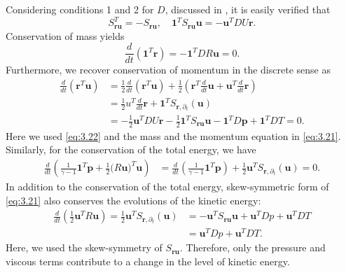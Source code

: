 Considering conditions 1 and 2 for $D$, discussed in , it is easily verified that
\begin{equation} \label{eq:3.22}
	S_{\mathbf r \mathbf u}^T = - S_{\mathbf r \mathbf u}, \quad \mathbf 1^T S_{\mathbf r \mathbf u} \mathbf u = - \mathbf u^T DU \mathbf r.
\end{equation}
Conservation of mass yields
\begin{equation} \label{eq:3.23}
	\frac{d}{dt} (\mathbf 1^T \mathbf r) = - \mathbf 1^T DR\mathbf u = 0. 
\end{equation}
Furthermore, we recover conservation of momentum in the discrete sense as
\begin{equation} \label{eq:3.24}
\begin{aligned}
	\frac{d}{dt}(\mathbf r^T \mathbf u) &= \frac{1}{2} \frac{d}{dt}(\mathbf r^T \mathbf u) + \frac{1}{2} \left( \mathbf r^T \frac d{dt} \mathbf u +\mathbf u^T \frac{d}{dt} \mathbf r \right)\\
	&= \frac{1}{2}u^T \frac d{dt} \mathbf r + \mathbf 1^T S_{\mathbf r,\partial_t} (\mathbf u) \\
	&= -\frac 1 2 \mathbf u^T DU \mathbf r  - \frac 1 2 \mathbf 1^T S_{\mathbf r \mathbf u} \mathbf u - \mathbf 1^T D\mathbf p +  \mathbf 1^T D T = 0.
\end{aligned}
\end{equation}
Here we used \eqref{eq:3.22} and the mass and the momentum equation in \eqref{eq:3.21}. Similarly, for the conservation of the total energy, we have
\begin{equation} \label{eq:3.25}
\begin{aligned}
	\frac{d}{dt} \left( \frac{1}{\gamma - 1} \mathbf 1^T \mathbf p + \frac 1 2 \mathbf (R\mathbf u)^T \mathbf u  \right) &= \frac{d}{dt} \left( \frac{1}{\gamma - 1} \mathbf 1^T \mathbf p \right) + \frac 1 2 \mathbf u^T  S_{\mathbf r,\partial_t} (\mathbf u) = 0.
\end{aligned}
\end{equation}
In addition to the conservation of the total energy, skew-symmetric form of \eqref{eq:3.21} also conserves the evolutions of the kinetic energy:
\begin{equation} \label{eq:3.26}
\begin{aligned}
	\frac{d}{dt} ( \frac 1 2 \mathbf u^T R\mathbf u) = \frac 1 2 \mathbf u^T S_{\mathbf r,\partial_t} (\mathbf u) &= -\mathbf u ^T S_{\mathbf r \mathbf u} \mathbf u + \mathbf u^T D p + \mathbf u^T DT \\
	&= \mathbf u^T D p + \mathbf u^T DT.
\end{aligned}
\end{equation}
Here, we used the skew-symmetry of $S_{\mathbf r \mathbf u}$. Therefore, only the pressure and viscous terms contribute to a change in the level of kinetic energy.

